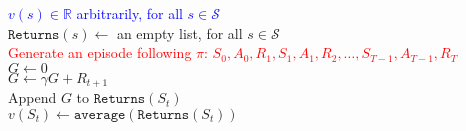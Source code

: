 \documentclass{standalone}
\begin{document}
\pagestyle{empty}
\begin{algorithm}[H]
  \textcolor{blue}{$v(s) \in \mathbb R$ arbitrarily, for all $s \in \mathcal S$ \\}
  $\texttt{Returns}(s) \gets$ an empty list, for all $s \in \mathcal S$ \\
   {
    \textcolor{red}{Generate an episode following $\pi$: $S_0, A_0, R_1, S_1, A_1, R_2,     \ldots,S_{T-1}, A_{T-1}, R_T$ \\}
    $G\gets 0$ \\
     {
      $G \gets \gamma G + R_{t+1}$ \\
       {
        Append $G$ to $\texttt{Returns}(S_t)$ \\
        $v(S_t) \gets \texttt{average}(\texttt{Returns}(S_t))$
      }
    }
  }
\end{algorithm}
\end{document}
